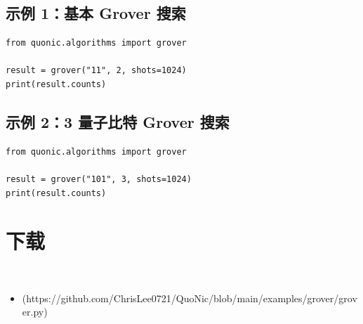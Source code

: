 \documentclass[12pt,a4paper]{article}
\begin{document}
\subsection{示例 1：基本 Grover 搜索}

\begin{lstlisting}[style=python]
from quonic.algorithms import grover

result = grover("11", 2, shots=1024)
print(result.counts)
\end{lstlisting}

\subsection{示例 2：3 量子比特 Grover 搜索}

\begin{lstlisting}[style=python]
from quonic.algorithms import grover

result = grover("101", 3, shots=1024)
print(result.counts)
\end{lstlisting}


\section{下载}

\begin{itemize}
  \item [grover.py](https://github.com/ChrisLee0721/QuoNic/blob/main/examples/grover/grover.py)
\end{itemize}
\end{document}
